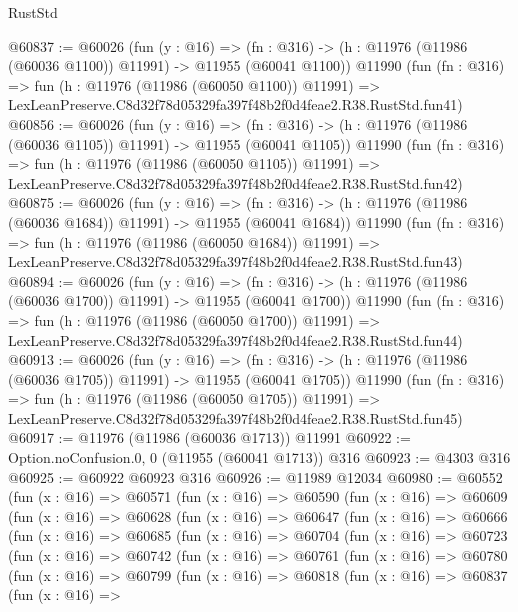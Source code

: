 \begin{lexlean}{RustStd}
\begin{coremodule}
@60837 := @60026
    (fun (y : @16) =>
    (fn : @316) -> (h : @11976 (@11986 (@60036 @1100)) @11991) -> @11955 (@60041 @1100))
    @11990
    (fun (fn : @316) =>
    fun (h : @11976 (@11986 (@60050 @1100)) @11991) =>
    LexLeanPreserve.C8d32f78d05329fa397f48b2f0d4feae2.R38.RustStd.fun41)
@60856 := @60026
    (fun (y : @16) =>
    (fn : @316) -> (h : @11976 (@11986 (@60036 @1105)) @11991) -> @11955 (@60041 @1105))
    @11990
    (fun (fn : @316) =>
    fun (h : @11976 (@11986 (@60050 @1105)) @11991) =>
    LexLeanPreserve.C8d32f78d05329fa397f48b2f0d4feae2.R38.RustStd.fun42)
@60875 := @60026
    (fun (y : @16) =>
    (fn : @316) -> (h : @11976 (@11986 (@60036 @1684)) @11991) -> @11955 (@60041 @1684))
    @11990
    (fun (fn : @316) =>
    fun (h : @11976 (@11986 (@60050 @1684)) @11991) =>
    LexLeanPreserve.C8d32f78d05329fa397f48b2f0d4feae2.R38.RustStd.fun43)
@60894 := @60026
    (fun (y : @16) =>
    (fn : @316) -> (h : @11976 (@11986 (@60036 @1700)) @11991) -> @11955 (@60041 @1700))
    @11990
    (fun (fn : @316) =>
    fun (h : @11976 (@11986 (@60050 @1700)) @11991) =>
    LexLeanPreserve.C8d32f78d05329fa397f48b2f0d4feae2.R38.RustStd.fun44)
@60913 := @60026
    (fun (y : @16) =>
    (fn : @316) -> (h : @11976 (@11986 (@60036 @1705)) @11991) -> @11955 (@60041 @1705))
    @11990
    (fun (fn : @316) =>
    fun (h : @11976 (@11986 (@60050 @1705)) @11991) =>
    LexLeanPreserve.C8d32f78d05329fa397f48b2f0d4feae2.R38.RustStd.fun45)
@60917 := @11976 (@11986 (@60036 @1713)) @11991
@60922 := Option.noConfusion.{0, 0} (@11955 (@60041 @1713)) @316
@60923 := @4303 @316
@60925 := @60922 @60923 @316
@60926 := @11989 @12034
@60980 := @60552
    (fun (x : @16) =>
    @60571
      (fun (x : @16) =>
      @60590
        (fun (x : @16) =>
        @60609
          (fun (x : @16) =>
          @60628
            (fun (x : @16) =>
            @60647
              (fun (x : @16) =>
              @60666
                (fun (x : @16) =>
                @60685
                  (fun (x : @16) =>
                  @60704
                    (fun (x : @16) =>
                    @60723
                      (fun (x : @16) =>
                      @60742
                        (fun (x : @16) =>
                        @60761
                          (fun (x : @16) =>
                          @60780
                            (fun (x : @16) =>
                            @60799
                              (fun (x : @16) =>
                              @60818
                                (fun (x : @16) =>
                                @60837
                                  (fun (x : @16) =>

\end{coremodule}
\end{lexlean}
